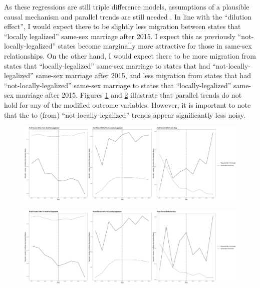 \documentclass[12pt,letterpaper]{article}
\begin{document}
As these regressions are still triple difference models, assumptions of a plausible causal mechanism and parallel trends are still needed \citep{24, 25}. In line with the “dilution effect”, I would expect there to be slightly less migration between states that “locally legalized” same-sex marriage after 2015. I expect this as previously “not-locally-legalized” states become marginally more attractive for those in same-sex relationships. On the other hand, I would expect there to be more migration from states that “locally-legalized” same-sex marriage to states that had “not-locally-legalized” same-sex marriage after 2015, and less migration from states that had “not-locally-legalized” same-sex marriage to states that “locally-legalized” same-sex marriage after 2015. Figures \ref{fig: flows_post_diffs} and \ref{fig: flows_ante_diffs} illustrate that parallel trends do not hold for any of the modified outcome variables. However, it is important to note that the to (from) “not-locally-legalized” trends appear significantly less noisy.

\begin{figure}[htbp]
    \centering
    \includegraphics[width=1\linewidth]{outputs/summary_stats/flows_post_diffs.png}
    \caption{}
    \label{fig: flows_post_diffs}
\end{figure}
\begin{figure}[htbp]
    \centering
    \includegraphics[width=1\linewidth]{outputs/summary_stats/flows_ante_diffs.png}
    \caption{}
    \label{fig: flows_ante_diffs}
\end{figure}
\end{document}
